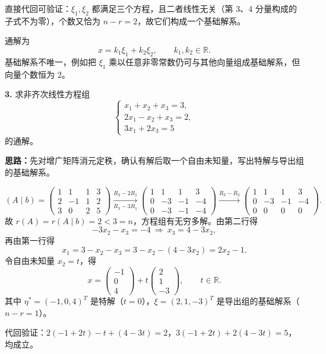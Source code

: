 直接代回可验证：$\xi_1,\xi_2$ 都满足三个方程，且二者线性无关（第 3、4 分量构成的子式不为零），个数又恰为 $n-r=2$，故它们构成一个基础解系。

通解为
\[
x=k_1\xi_1+k_2\xi_2,\qquad k_1,k_2\in\mathbb R.
\]
基础解系不唯一，例如把 $\xi_1$ 乘以任意非零常数仍可与其他向量组成基础解系，但向量个数恒为 $2$。

\else \answerarea[10] \fi%

\textbf{3.} 求非齐次线性方程组
\[
\begin{cases}
x_1+x_2+x_3=3,\\
2x_1-x_2+x_3=2,\\
3x_1+2x_3=5
\end{cases}
\]
的通解。

\ifshowsolutions%

\textbf{思路：}先对增广矩阵消元定秩，确认有解后取一个自由未知量，写出特解与导出组的基础解系。

\[
(A\mid b)=\left(\begin{array}{ccc|c}
1&1&1&3\\
2&-1&1&2\\
3&0&2&5
\end{array}\right)
\xrightarrow[R_3-3R_1]{R_2-2R_1}
\left(\begin{array}{ccc|c}
1&1&1&3\\
0&-3&-1&-4\\
0&-3&-1&-4
\end{array}\right)
\xrightarrow{R_3-R_2}
\left(\begin{array}{ccc|c}
1&1&1&3\\
0&-3&-1&-4\\
0&0&0&0
\end{array}\right).
\]
故 $r(A)=r(A\mid b)=2<3=n$，方程组有无穷多解。由第二行得
\[
-3x_2-x_3=-4\ \Longrightarrow\ x_3=4-3x_2,
\]
再由第一行得
\[
x_1=3-x_2-x_3=3-x_2-(4-3x_2)=2x_2-1.
\]
令自由未知量 $x_2=t$，得
\[
x=\begin{pmatrix}-1\\0\\4\end{pmatrix}+t\begin{pmatrix}2\\1\\-3\end{pmatrix},\qquad t\in\mathbb R.
\]
其中 $\eta^*=(-1,0,4)^T$ 是特解（$t=0$），$\xi=(2,1,-3)^T$ 是导出组的基础解系（$n-r=1$）。

代回验证：$2(-1+2t)-t+(4-3t)=2$，$3(-1+2t)+2(4-3t)=5$，均成立。

